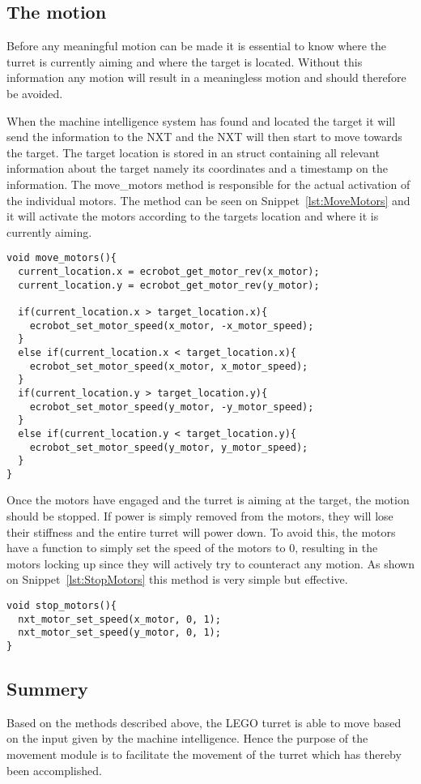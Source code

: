 \subsection{The motion}
Before any meaningful motion can be made it is essential to know where the turret is currently aiming and where the target is located. 
Without this information any motion will result in a meaningless motion and should therefore be avoided. 

When the machine intelligence system has found and located the target it will send the information to the NXT and the NXT will then start to move towards the target. 
The target location is stored in an struct containing all relevant information about the target namely its coordinates and a timestamp on the information. 
The move\_motors method is responsible for the actual activation of the individual motors.
The method can be seen on Snippet~\ref{lst:MoveMotors} and it will activate the motors according to the targets location and where it is currently aiming. 
\begin{lstlisting}[language=CSharp,caption={move\_motors method from movement.c},label={lst:MoveMotors}]
void move_motors(){
  current_location.x = ecrobot_get_motor_rev(x_motor);
  current_location.y = ecrobot_get_motor_rev(y_motor);

  if(current_location.x > target_location.x){
    ecrobot_set_motor_speed(x_motor, -x_motor_speed);
  }
  else if(current_location.x < target_location.x){
    ecrobot_set_motor_speed(x_motor, x_motor_speed);
  }
  if(current_location.y > target_location.y){
    ecrobot_set_motor_speed(y_motor, -y_motor_speed);
  }
  else if(current_location.y < target_location.y){
    ecrobot_set_motor_speed(y_motor, y_motor_speed);
  }
}
\end{lstlisting}
Once the motors have engaged and the turret is aiming at the target, the motion should be stopped. 
If power is simply removed from the motors, they will lose their stiffness and the entire turret will power down. 
To avoid this, the motors have a function to simply set the speed of the motors to $0$, resulting in the motors locking up since they will actively try to counteract any motion. 
As shown on Snippet~\ref{lst:StopMotors} this method is very simple but effective. 
\begin{lstlisting}[language=CSharp,label={lst:StopMotors},caption={stop\_motors method from movement.c}]
void stop_motors(){
  nxt_motor_set_speed(x_motor, 0, 1);
  nxt_motor_set_speed(y_motor, 0, 1);
}
\end{lstlisting}

\subsection{Summery}
Based on the methods described above, the LEGO turret is able to move based on the input given by the machine intelligence. 
Hence the purpose of the movement module is to facilitate the movement of the turret which has thereby been accomplished. 
